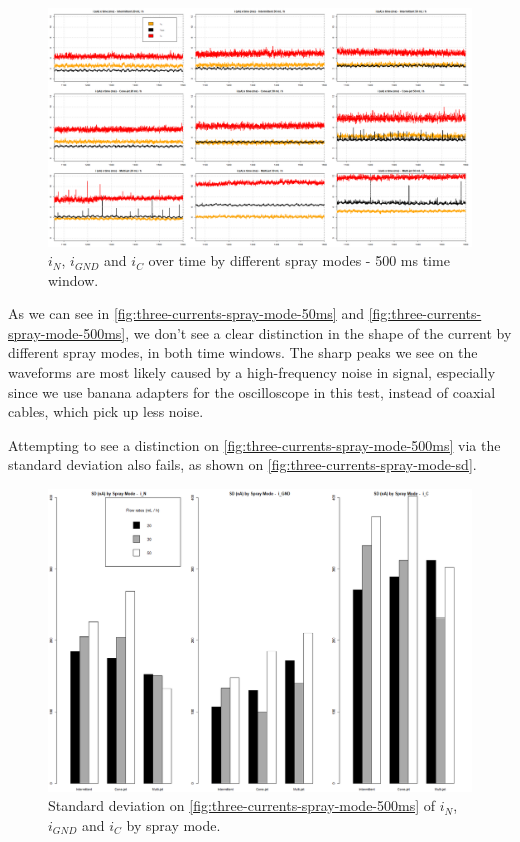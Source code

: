 \documentclass[oneside,12pt]{article}
\begin{document}
\begin{figure}[h!]
    \centering
    \includegraphics[width=1\textwidth,trim=1 1 1 1,clip]{figures/three-currents-spray-mode-500ms.png}
    \caption{$i_N$, $i_{GND}$ and $i_C$ over time by different spray modes - 500 ms time window.}
    \label{fig:three-currents-spray-mode-500ms}
\end{figure}

As we can see in \autoref{fig:three-currents-spray-mode-50ms} and \autoref{fig:three-currents-spray-mode-500ms}, 
we don't see a clear distinction in the shape of the current 
by different spray modes, in both time windows. The sharp peaks we see on the waveforms are most likely caused
by a high-frequency noise in signal, especially since we use banana adapters for the oscilloscope in this test, instead
of coaxial cables, which pick up less noise.

Attempting to see a distinction on \autoref{fig:three-currents-spray-mode-500ms} via the standard deviation also
fails, as shown on \autoref{fig:three-currents-spray-mode-sd}.

\begin{figure}[h!]
    \centering
    \includegraphics[width=1\textwidth,trim=1 1 1 1,clip]{figures/three-currents-spray-mode-sd.png}
    \caption{Standard deviation on \autoref{fig:three-currents-spray-mode-500ms} of $i_N$, $i_{GND}$ and $i_C$
    by spray mode.}
    \label{fig:three-currents-spray-mode-sd}
\end{figure}
\end{document}
